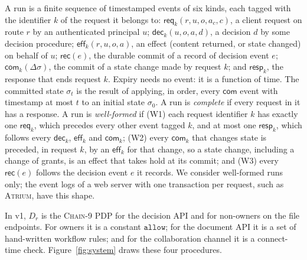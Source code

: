 \documentclass[sigconf,review,anonymous]{acmart}
\newcommand{\sysname}{\textsc{Atrium}\xspace}
\newcommand{\sysname}{\textsc{OpenZTAC}\xspace}
\newcommand{\chain}{\textsc{Chain-9}\xspace}
\newcommand{\allowv}{\mathtt{allow}}
\newcommand{\ev}[1]{\mathsf{#1}}
\begin{document}
\begin{definition}[Runs]\label{def:runs}
A run is a finite sequence of timestamped events of six kinds, each tagged with the identifier $k$ of the request
it belongs to: $\ev{req}_k(r,u,o,a_c,c)$, a client request on route $r$ by an authenticated principal $u$;
$\ev{dec}_k(u,o,a,d)$, a decision $d$ by some decision procedure;
$\ev{eff}_k(r,u,o,a)$, an effect (content returned, or state changed) on behalf of $u$;
$\ev{rec}(e)$, the durable commit of a record of decision event $e$;
$\ev{com}_k(\Delta\sigma)$, the commit of a state change made by request $k$; and
$\ev{resp}_k$, the response that ends request $k$. Expiry needs no event: it is a function of time. The
committed state $\sigma_t$ is the result of applying, in order, every $\ev{com}$ event with timestamp at most $t$
to an initial state $\sigma_0$. A run is \emph{complete} if every request in it has a response. A run is
\emph{well-formed} if (W1) each request identifier $k$ has exactly one $\ev{req}_k$, which precedes every other
event tagged $k$, and at most one $\ev{resp}_k$, which follows every $\ev{dec}_k$, $\ev{eff}_k$ and $\ev{com}_k$;
(W2) every $\ev{com}_k$ that changes state is preceded, in request $k$, by an $\ev{eff}_k$ for that change, so a
state change, including a change of grants, is an effect that takes hold at its commit; and (W3) every $\ev{rec}(e)$ follows the decision event $e$ it
records. We consider well-formed runs only; the event logs of a web server with one transaction per request,
such as \sysname, have this shape.
\end{definition}

In v1, $D_r$ is the \chain PDP for the decision API and for non-owners on the file endpoints. For owners it
is a constant $\allowv$; for the document API it is a set of hand-written workflow rules; and for the
collaboration channel it is a connect-time check. Figure~\ref{fig:system} draws these four procedures.
\end{document}
